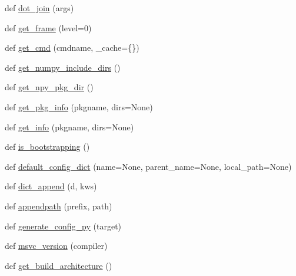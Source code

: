 \begin{DoxyCompactItemize}
\item 
def \hyperlink{namespacenumpy_1_1distutils_1_1misc__util_acae71a236604bcfc1bb979ddb9eecd4d}{dot\+\_\+join} (args)
\item 
def \hyperlink{namespacenumpy_1_1distutils_1_1misc__util_a2d0fef68b1ba036d9cd93a372f9d3147}{get\+\_\+frame} (level=0)
\item 
def \hyperlink{namespacenumpy_1_1distutils_1_1misc__util_a203598b75a897a54b3f4137e888d4af5}{get\+\_\+cmd} (cmdname, \+\_\+cache=\{\})
\item 
def \hyperlink{namespacenumpy_1_1distutils_1_1misc__util_a7df9726661488fc7754069f949cd2d6f}{get\+\_\+numpy\+\_\+include\+\_\+dirs} ()
\item 
def \hyperlink{namespacenumpy_1_1distutils_1_1misc__util_aa82e150828327e03d9e8629bf1d0e9eb}{get\+\_\+npy\+\_\+pkg\+\_\+dir} ()
\item 
def \hyperlink{namespacenumpy_1_1distutils_1_1misc__util_a28a63bf59c3940a428430834e8e2030a}{get\+\_\+pkg\+\_\+info} (pkgname, dirs=None)
\item 
def \hyperlink{namespacenumpy_1_1distutils_1_1misc__util_aba1fb133d0d29510bb87e6d599dff9b8}{get\+\_\+info} (pkgname, dirs=None)
\item 
def \hyperlink{namespacenumpy_1_1distutils_1_1misc__util_ab32582b42630ba9140624903f98fca01}{is\+\_\+bootstrapping} ()
\item 
def \hyperlink{namespacenumpy_1_1distutils_1_1misc__util_a90125e3989d9286f8d8ef96989c0345d}{default\+\_\+config\+\_\+dict} (name=None, parent\+\_\+name=None, local\+\_\+path=None)
\item 
def \hyperlink{namespacenumpy_1_1distutils_1_1misc__util_a31734ab9309be37bd6629b4650bd6d1a}{dict\+\_\+append} (d, kws)
\item 
def \hyperlink{namespacenumpy_1_1distutils_1_1misc__util_ab07ecdb285a4624852ae0562231bf2df}{appendpath} (prefix, path)
\item 
def \hyperlink{namespacenumpy_1_1distutils_1_1misc__util_a33d41fe368c843fb3fffe812324db6ac}{generate\+\_\+config\+\_\+py} (target)
\item 
def \hyperlink{namespacenumpy_1_1distutils_1_1misc__util_acb0165be2f5b5b1cb932bb3e72936e8a}{msvc\+\_\+version} (compiler)
\item 
def \hyperlink{namespacenumpy_1_1distutils_1_1misc__util_aaa9dea98da2fea7a693d21bd136912e0}{get\+\_\+build\+\_\+architecture} ()
\end{DoxyCompactItemize}
